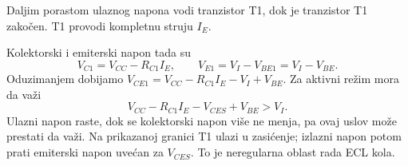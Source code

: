 Daljim porastom ulaznog napona vodi tranzistor T1, dok je tranzistor T1 zakočen. T1 provodi kompletnu struju $I_E$.

Kolektorski i emiterski napon tada su
\[V_{C1}=V_{CC}-R_{C1}I_E,\qquad V_{E1}=V_I-V_{BE1}=V_I-V_{BE}.\]
Oduzimanjem dobijamo $V_{CE1}=V_{CC}-R_{C1}I_E-V_I+V_{BE}$. Za aktivni režim mora da važi
\[V_{CC}-R_{C1}I_E-V_{CES}+V_{BE}>V_I.\]
Ulazni napon raste, dok se kolektorski napon više ne menja, pa ovaj uslov može prestati da važi. Na prikazanoj granici T1 ulazi u zasićenje; izlazni napon potom prati emiterski napon uvećan za $V_{CES}$. To je neregularna oblast rada ECL kola.
